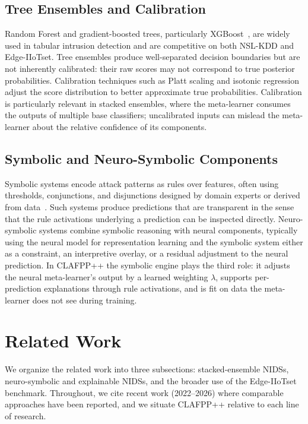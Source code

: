 \documentclass[pdflatex,sn-mathphys-num]{sn-jnl}
\theoremstyle{thmstyleone}
\theoremstyle{thmstyletwo}
\theoremstyle{thmstylethree}
\begin{document}
\subsection{Tree Ensembles and Calibration}
Random Forest and gradient-boosted trees, particularly XGBoost~\cite{chen2016xgboost}, are widely used in tabular intrusion detection and are competitive on both NSL-KDD and Edge-IIoTset. Tree ensembles produce well-separated decision boundaries but are not inherently calibrated: their raw scores may not correspond to true posterior probabilities. Calibration techniques such as Platt scaling and isotonic regression~\cite{platt1999probabilistic,niculescu2005predicting} adjust the score distribution to better approximate true probabilities. Calibration is particularly relevant in stacked ensembles, where the meta-learner consumes the outputs of multiple base classifiers; uncalibrated inputs can mislead the meta-learner about the relative confidence of its components.

\subsection{Symbolic and Neuro-Symbolic Components}
Symbolic systems encode attack patterns as rules over features, often using thresholds, conjunctions, and disjunctions designed by domain experts or derived from data~\cite{neurosymbolic2025iot}. Such systems produce predictions that are transparent in the sense that the rule activations underlying a prediction can be inspected directly. Neuro-symbolic systems combine symbolic reasoning with neural components, typically using the neural model for representation learning and the symbolic system either as a constraint, an interpretive overlay, or a residual adjustment to the neural prediction. In CLAFPP++ the symbolic engine plays the third role: it adjusts the neural meta-learner's output by a learned weighting $\lambda$, supports per-prediction explanations through rule activations, and is fit on data the meta-learner does not see during training.

\section{Related Work}\label{sec:related}

We organize the related work into three subsections: stacked-ensemble NIDSs, neuro-symbolic and explainable NIDSs, and the broader use of the Edge-IIoTset benchmark. Throughout, we cite recent work (2022--2026) where comparable approaches have been reported, and we situate CLAFPP++ relative to each line of research.
\end{document}
